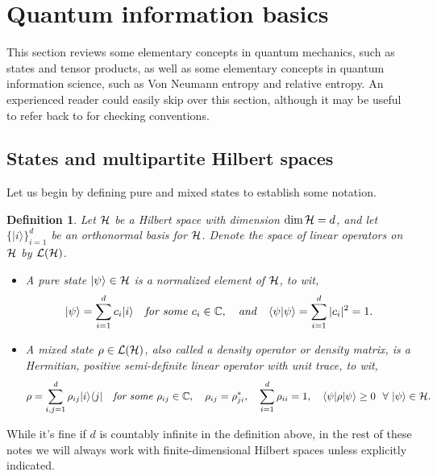\documentclass[a4paper,11pt]{article}
\newtheorem{defn}[thm]{Definition}
\newcommand{\bra}[1]{\langle #1|}
\newcommand{\ket}[1]{|#1\rangle}
\newcommand{\braket}[2]{\langle #1|#2\rangle}
\newcommand{\ketbra}[2]{| #1 \rangle \langle #2 |}
\newcommand{\Hil}{{\cal H}}
\newcommand{\Note}{\noindent {\bf Note:~}}
\begin{document}
\section{Quantum information basics}
\label{sec:QIbasics}

This section reviews some elementary concepts in quantum mechanics, such as states and tensor products, as well as some elementary concepts in quantum information science, such as Von Neumann entropy and relative entropy.
An experienced reader could easily skip over this section, although it may be useful to refer back to for checking conventions.


\subsection{States and multipartite Hilbert spaces}

Let us begin by defining pure and mixed states to establish some notation.

\begin{defn}
Let $\Hil$ be a Hilbert space with dimension $\dim \Hil = d$, and let $\{ \ket{i} \}_{i=1}^d$ be an orthonormal basis for $\Hil$.
Denote the space of linear operators on $\Hil$ by $\mathcal{L}(\Hil)$.
\begin{itemize}
\item A \emph{pure state} $\ket{\psi} \in \Hil$ is a normalized element of $\Hil$, to wit,
\begin{equation*}
\ket{\psi} = \sum_{i=1}^d c_i \ket{i} \quad \text{\emph{for some}} ~ c_i \in \mathbb{C}, \quad \text{\emph{and}} \quad \braket{\psi}{\psi} = \sum_{i=1}^d |c_i|^2 = 1.
\end{equation*}
\item A \emph{mixed state} $\rho \in \mathcal{L}(\Hil)$, also called a \emph{density operator} or \emph{density matrix}, is a Hermitian, positive semi-definite linear operator with unit trace, to wit,
\begin{equation*}
\rho = \sum_{i,j=1}^d \rho_{ij} \ketbra{i}{j} \quad \text{\emph{for some}} ~ \rho_{ij} \in \mathbb{C}, \quad \rho_{ij} = \rho_{ji}^*, \quad \sum_{i=1}^d \rho_{ii} = 1, \quad \bra{\psi}\rho\ket{\psi} \geq 0 ~~\forall~\ket{\psi}\in \Hil.
\end{equation*}
\end{itemize}
\end{defn}
\Note While it's fine if $d$ is countably infinite in the definition above, in the rest of these notes we will always work with finite-dimensional Hilbert spaces unless explicitly indicated.
\end{document}
